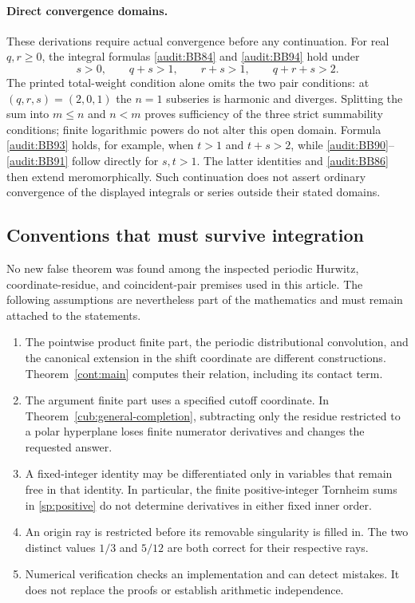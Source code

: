 \documentclass[11pt,a4paper]{article}
\theoremstyle{definition}
\theoremstyle{remark}
\numberwithin{equation}{section}
\begin{document}
\paragraph{Direct convergence domains.}
These derivations require actual convergence before any continuation.
For real $q,r\ge0$, the integral formulas
\eqref{audit:BB84} and \eqref{audit:BB94} hold under
\begin{equation}
 s>0,\qquad q+s>1,\qquad r+s>1,\qquad q+r+s>2.
 \label{audit:BB-domain}
\end{equation}
The printed total-weight condition alone omits the two pair conditions:
at $(q,r,s)=(2,0,1)$ the $n=1$ subseries is harmonic and diverges.
Splitting the sum into $m\le n$ and $n<m$ proves sufficiency of the
three strict summability conditions; finite logarithmic powers do not
alter this open domain. Formula \eqref{audit:BB93} holds, for example,
when $t>1$ and $t+s>2$, while \eqref{audit:BB90}--\eqref{audit:BB91}
follow directly for $s,t>1$. The latter identities and
\eqref{audit:BB86} then extend meromorphically. Such continuation does
not assert ordinary convergence of the displayed integrals or series
outside their stated domains.



\subsection{Conventions that must survive integration}

No new false theorem was found among the inspected periodic Hurwitz,
coordinate-residue, and coincident-pair premises used in this article.
The following assumptions are nevertheless part of the mathematics
and must remain attached to the statements.

\begin{enumerate}
\item The pointwise product finite part, the periodic distributional
      convolution, and the canonical extension in the shift coordinate
      are different constructions. Theorem~\ref{cont:main} computes
      their relation, including its contact term.
\item The argument finite part uses a specified cutoff coordinate.
      In Theorem~\ref{cub:general-completion}, subtracting only the
      residue restricted to a polar hyperplane loses finite numerator
      derivatives and changes the requested answer.
\item A fixed-integer identity may be differentiated only in variables
      that remain free in that identity. In particular, the finite
      positive-integer Tornheim sums in \eqref{sp:positive} do not
      determine derivatives in either fixed inner order.
\item An origin ray is restricted before its removable singularity is
      filled in. The two distinct values $1/3$ and $5/12$ are both
      correct for their respective rays.
\item Numerical verification checks an implementation and can detect
      mistakes. It does not replace the proofs or establish arithmetic
      independence.
\end{enumerate}
\end{document}

